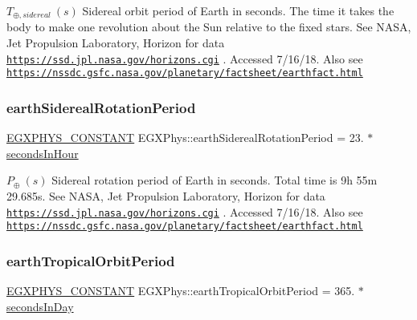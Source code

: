 $ T_{\oplus,sidereal} \ (s)$ Sidereal orbit period of Earth in seconds. The time it takes the body to make one revolution about the Sun relative to the fixed stars. See N\+A\+SA, Jet Propulsion Laboratory, Horizon for data \href{https://ssd.jpl.nasa.gov/horizons.cgi}{\tt https\+://ssd.\+jpl.\+nasa.\+gov/horizons.\+cgi} . Accessed 7/16/18. Also see \href{https://nssdc.gsfc.nasa.gov/planetary/factsheet/earthfact.html}{\tt https\+://nssdc.\+gsfc.\+nasa.\+gov/planetary/factsheet/earthfact.\+html} \mbox{\label{group___e_g_x_phys-_constants-_astrophysics-_solar_system-_earth-_orbit_ga8ed3950e5beb733fd3ff9dad87879824}} 
\subsubsection{\texorpdfstring{earth\+Sidereal\+Rotation\+Period}{earthSiderealRotationPeriod}}
{\footnotesize\ttfamily \mbox{\hyperlink{group___e_g_x_phys-_constants-_macros_ga76980d288494ce1714c9ac68a95ba702}{E\+G\+X\+P\+H\+Y\+S\+\_\+\+C\+O\+N\+S\+T\+A\+NT}} E\+G\+X\+Phys\+::earth\+Sidereal\+Rotation\+Period = 23. $\ast$ \mbox{\hyperlink{namespace_e_g_x_phys_a7c3165cd93e36f1fb8e9fef80f117bef}{seconds\+In\+Hour}}}

$ P_{\oplus} \ (s)$ Sidereal rotation period of Earth in seconds. Total time is 9h 55m 29.\+685s. See N\+A\+SA, Jet Propulsion Laboratory, Horizon for data \href{https://ssd.jpl.nasa.gov/horizons.cgi}{\tt https\+://ssd.\+jpl.\+nasa.\+gov/horizons.\+cgi} . Accessed 7/16/18. Also see \href{https://nssdc.gsfc.nasa.gov/planetary/factsheet/earthfact.html}{\tt https\+://nssdc.\+gsfc.\+nasa.\+gov/planetary/factsheet/earthfact.\+html} \mbox{\label{group___e_g_x_phys-_constants-_astrophysics-_solar_system-_earth-_orbit_ga8bfaa9c23b81c32f1576a1fa9ee042df}} 
\subsubsection{\texorpdfstring{earth\+Tropical\+Orbit\+Period}{earthTropicalOrbitPeriod}}
{\footnotesize\ttfamily \mbox{\hyperlink{group___e_g_x_phys-_constants-_macros_ga76980d288494ce1714c9ac68a95ba702}{E\+G\+X\+P\+H\+Y\+S\+\_\+\+C\+O\+N\+S\+T\+A\+NT}} E\+G\+X\+Phys\+::earth\+Tropical\+Orbit\+Period = 365. $\ast$ \mbox{\hyperlink{namespace_e_g_x_phys_a93d2a00d75411b58cbf63ab3fd1f8bc2}{seconds\+In\+Day}}}

